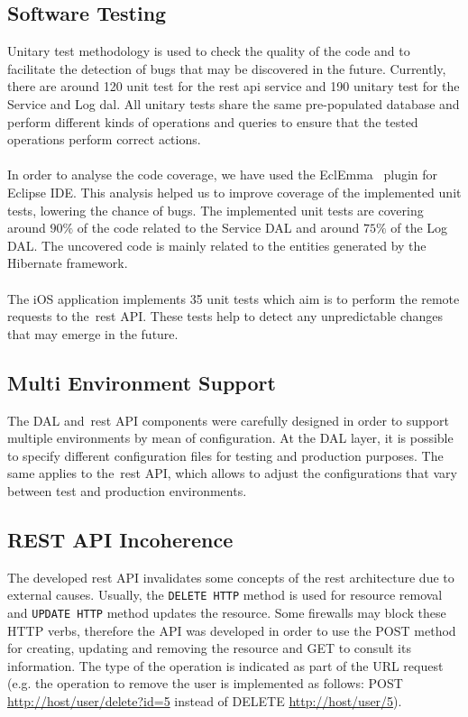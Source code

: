 \subsection{Software Testing}
\label{subsec:softwareTesting}
Unitary test methodology is used to check the quality of the code and to facilitate the detection of bugs that may be discovered in the future. Currently, there are around 120 unit test for the \gls{rest} \gls{api} service and 190 unitary test for the Service and Log \gls{dal}. All unitary tests share the same pre-populated database and perform different kinds of operations and queries to ensure that the tested operations perform correct actions.\\
\\
In order to analyse the code coverage, we have used the EclEmma~\cite{codeCoveragEclEmma} plugin for Eclipse IDE. This analysis helped us to improve coverage of the implemented unit tests, lowering the chance of bugs. The implemented unit tests are covering around $90\%$ of the code related to the Service DAL and around $75\%$ of the Log DAL. The uncovered code is mainly related to the entities generated by the Hibernate framework.\\
\\
The iOS application implements 35 unit tests which aim is to perform the remote requests to the~\gls{rest} API. These tests help to detect any unpredictable changes that may emerge in the future.
\subsection{Multi Environment Support}
\label{subsec:multiEnvironmentSupport}
The DAL and~\gls{rest} API components were carefully designed in order to support multiple environments by mean of configuration. At the DAL layer, it is possible to specify different configuration files for testing and production purposes. The same applies to the~\gls{rest} API, which allows to adjust the configurations that vary between test and production environments.

\subsection{REST API Incoherence}
\label{subsec:restAPIIncoherence}
The developed \gls{rest} API invalidates some concepts of the \gls{rest} architecture due to external causes. Usually, the \verb"DELETE HTTP" method is used for resource removal and \verb"UPDATE HTTP" method updates the resource. Some firewalls may block these HTTP verbs, therefore the API was developed in order to use the POST method for creating, updating and removing the resource and GET to consult its information. The type of the operation is indicated as part of the URL request (e.g. the operation to remove the user is implemented as follows: POST \url{http://host/user/delete?id=5} instead of DELETE \url{http://host/user/5}).